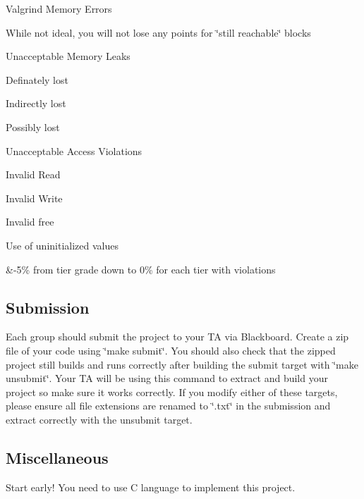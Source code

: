 \begin{longtabu}
\begin{DoxyItemize}
\item Valgrind Memory Errors  
\begin{DoxyItemize}
\item While not ideal, you will not lose any points for \char`\"{}still reachable\char`\"{} blocks  
\item Unacceptable Memory Leaks  
\begin{DoxyItemize}
\item Definately lost  
\item Indirectly lost  
\item Possibly lost  
\end{DoxyItemize}
\item Unacceptable Access Violations  
\begin{DoxyItemize}
\item Invalid Read  
\item Invalid Write  
\item Invalid free  
\item Use of uninitialized values  
\end{DoxyItemize}
\end{DoxyItemize}
\end{DoxyItemize}&-\/5\% from tier grade down to 0\% for each tier with violations   \\
\end{longtabu}


\subsection*{Submission}

Each group should submit the project to your TA via Blackboard. Create a zip file of your code using \char`\"{}make submit\char`\"{}. You should also check that the zipped project still builds and runs correctly after building the submit target with \char`\"{}make unsubmit\char`\"{}. Your TA will be using this command to extract and build your project so make sure it works correctly. If you modify either of these targets, please ensure all file extensions are renamed to \char`\"{}.\+txt\char`\"{} in the submission and extract correctly with the unsubmit target.

\subsection*{Miscellaneous}

Start early! You need to use C language to implement this project. 